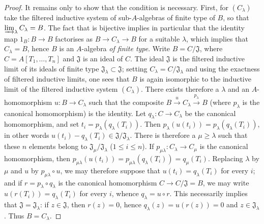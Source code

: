 \begin{proof}
It remains only to show that the condition is necessary.
First, for $(C_\lambda)$ take the filtered inductive system of sub-$A$-algebras of finite type of $B$, so that $\varinjlim_\lambda C_\lambda=B$.
The fact that  is bijective implies in particular that the identity map $1_B:B\to B$ factorises as $B\to C_\lambda\to B$ for a suitable $\lambda$, which implies that $C_\lambda=B$, hence $B$ is an $A$-algebra \emph{of finite type}.
Write $B=C/\mathfrak{J}$, where $C=A[T_1,\ldots,T_n]$ and $\mathfrak{J}$ is an ideal of $C$. The ideal $\mathfrak{J}$ is the filtered inductive limit of its ideals of finite type $\mathfrak{J}_\lambda\subset\mathfrak{J}$; setting $C_\lambda=C/\mathfrak{J}_\lambda$ and using the exactness of filtered inductive limits, one sees that $B$ is again isomorphic to the inductive limit of the filtered inductive system $(C_\lambda)$.
There exists therefore a $\lambda$ and an $A$-homomorphism $u:B\to C_\lambda$ such that the composite $B\xrightarrow{u}C_\lambda\xrightarrow{p_\lambda}B$ (where $p_\lambda$ is the canonical homomorphism) is the identity.
Let $q_\lambda:C\to C_\lambda$ be the canonical homomorphism, and set
$t_i=p_\lambda(q_\lambda(T_i))$.
Then $p_\lambda(u(t_i))=p_\lambda(q_\lambda(T_i))$, in other words
$u(t_i)-q_\lambda(T_i)\in\mathfrak{J}/\mathfrak{J}_\lambda$.
There is therefore a $\mu\geqslant\lambda$ such that these $n$ elements belong to
$\mathfrak{J}_\mu/\mathfrak{J}_\lambda$ ($1\leqslant i\leqslant n$).
If $p_{\mu\lambda}:C_\lambda\to C_\mu$ is the canonical homomorphism, then
$p_{\mu\lambda}(u(t_i))=p_{\mu\lambda}(q_\lambda(T_i))=q_\mu(T_i)$.
Replacing $\lambda$ by $\mu$ and $u$ by $p_{\mu\lambda}\circ u$, we may therefore
suppose that $u(t_i)=q_\lambda(T_i)$ for every $i$; and if
$r=p_\lambda\circ q_\lambda$ is the canonical homomorphism
$C\to C/\mathfrak{J}=B$, we may write $u(r(T_i))=q_\lambda(T_i)$ for every $i$,
whence $q_\lambda=u\circ r$.
This necessarily implies that $\mathfrak{J}=\mathfrak{J}_\lambda$: if $z\in\mathfrak{J}$, then $r(z)=0$, hence $q_\lambda(z)=u(r(z))=0$ and $z\in\mathfrak{J}_\lambda$. Thus $B=C_\lambda$.


\end{proof}
